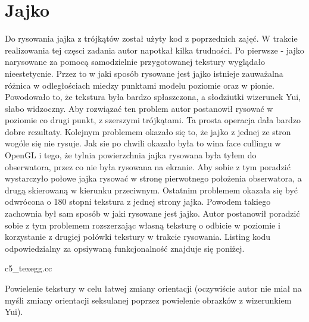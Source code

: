 \documentclass[polish,polish,a4paper]{report}
\begin{document}
\pagebreak
\section{Jajko}
Do rysowania jajka z trójkątów został użyty kod z poprzednich zajęć.
W trakcie realizowania tej częsci zadania autor napotkał kilka trudności.
Po pierwsze - jajko narysowane za pomocą samodzielnie przygotowanej tekstury wyglądało nieestetycnie.
Przez to w jaki sposób rysowane jest jajko istnieje zauważalna różnica w odległościach miedzy punktami modelu poziomie oraz w pionie.
Powodowało to, że tekstura była bardzo spłaszczona, a słodziutki wizerunek Yui, słabo widzoczny.
Aby rozwiązać ten problem autor postanowił rysować w poziomie co drugi punkt, z szerszymi trójkątami.
Ta prosta operacja dała bardzo dobre rezultaty.
Kolejnym problemem okazało się to, że jajko z jednej ze stron wogóle się nie rysuje.
Jak sie po chwili okazało była to wina face cullingu w OpenGL i tego, że tylnia powierzchnia jajka rysowana była tyłem do obserwatora, przez co nie była
rysowana na ekranie. Aby sobie z tym poradzić wystarczyło połowe jajka rysować w stronę pierwotnego położenia obserwatora, a drugą skierowaną w kierunku
przeciwnym. Ostatnim problemem okazała się być odwrócona o 180 stopni tekstura z jednej strony jajka.
Powodem takiego zachownia był sam sposób w jaki rysowane jest jajko.
Autor postanowił poradzić sobie z tym problemem rozszerzając własną teksturę o odbicie w poziomie i korzystanie z drugiej połówki tekstury w trakcie
rysowania. Listing kodu odpowiedzialny za opsiywaną funkcjonalność znajduje się poniżej.


{c5_texegg.cc}

Powielenie tekstury w celu łatwej zmiany orientacji (oczywiście autor nie miał na myśli zmiany orientacji seksulanej poprzez powielenie obrazków z 
wizerunkiem Yui).
\end{document}
